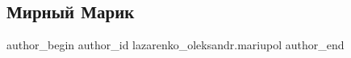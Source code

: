  
 
 
 
 

\subsection{Мирный Марик}
\label{sec:26_02_2023.fb.lazarenko_oleksandr.mariupol.1.mirnii_marik}

\ifcmt
 author_begin
   author_id lazarenko_oleksandr.mariupol
 author_end
\fi

